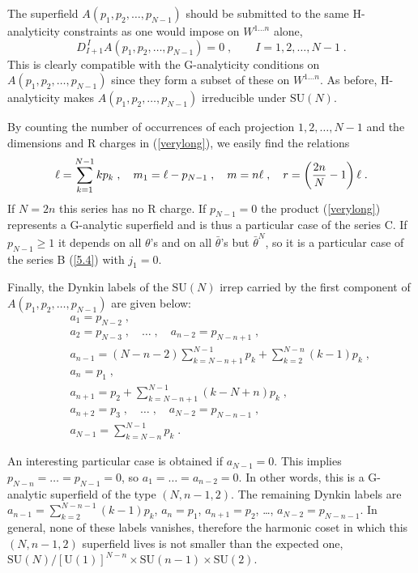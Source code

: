\documentclass[a4paper,12pt]{article}
\begin{document}
The superfield $A(p_1,p_2,\ldots,p_{N-1})$ should be submitted to 
the same H-analyticity constraints as one would impose on 
$W^{1\ldots n}$ alone, 
\begin{equation}\label{alone}
  D^{\, I}_{I+1}A(p_1,p_2,\ldots,p_{N-1})=0\;, \qquad 
I=1,2,\ldots, N-1\;. 
\end{equation}
This is clearly compatible with the G-analyticity conditions on 
$A(p_1,p_2,\ldots,p_{N-1})$ since they form a subset of these on 
$W^{1\ldots n}$. As before, H-analyticity makes 
$A(p_1,p_2,\ldots,p_{N-1})$ irreducible under $\mbox{SU}(N)$. 

By counting the number of occurrences of each projection 
$1,2,\ldots,N-1$ and the dimensions and R charges in 
(\ref{verylong}), we easily find the relations 
\begin{equation}\label{m-l}
   \ell= \sum^{N-1}_{k=1}kp_k\;, \quad m_1= \ell-p_{N-1}\;, \quad m=n\ell\;,
\quad  r= \left({2n\over N}-1 \right)\ell\;. 
\end{equation}
If $N=2n$ this series has no R charge. If $p_{N-1}=0$ the product
(\ref{verylong}) represents a G-analytic superfield and is thus a 
particular case of the series C. If $p_{N-1}\geq 1$ it depends on 
all $\theta$'s and on all $\bar\theta$'s but $\bar\theta^N$, so it 
is a particular case of the series  B (\ref{5.4}) with $j_1=0$. 

Finally, the Dynkin labels of the $\mbox{SU}(N)$ irrep carried by 
the first component of $A(p_1,p_2,\ldots,p_{N-1})$ are given 
below: 
\begin{eqnarray}
  && a_{1}=p_{N-2} \;,  \nonumber\\
  && a_{2}= p_{N-3}\;, \quad  \ldots\;, \quad  a_{n-2}= p_{N-n+1}\;,  \nonumber\\
  && a_{n-1}= (N-n-2)\sum_{k=N-n+1}^{N-1} p_k + 
  \sum_{k=2}^{N-n} (k-1)p_{k}\;, \nonumber\\ 
  && a_{n}= p_{1} \;,  \label{DL}  \\
  &&  a_{n+1}= p_2 + \sum_{k=N-n+1}^{N-1} (k-N+n)p_{k}\;,   \nonumber\\
  && a_{n+2}= p_{3} \;, \quad  \ldots\;, \quad a_{N-2} = 
p_{N-n-1}\;,  \nonumber\\ 
  && a_{N-1}= \sum_{k=N-n}^{N-1} p_k\;.   \nonumber
\end{eqnarray}  

An interesting particular case is obtained if $a_{N-1}= 0$. This 
implies $p_{N-n}=\ldots=p_{N-1}=0$, so $a_1=\ldots=a_{n-2}=0$. In 
other words, this is a G-analytic superfield of the type 
$(N,n-1,2)$. The remaining Dynkin labels are 
$a_{n-1}=\sum_{k=2}^{N-n-1} (k-1)p_{k} $, $a_n=p_1$, 
$a_{n+1}=p_2$, \ldots, $a_{N-2}=p_{N-n-1}$. In general, none of 
these labels vanishes, therefore the harmonic coset in which this 
$(N,n-1,2)$ superfield lives is not smaller than the expected one, 
$\mbox{SU}(N)/[\mbox{U}(1)]^{N-n}\times \mbox{SU}(n-1)\times 
\mbox{SU}(2)$.   
\end{document}
